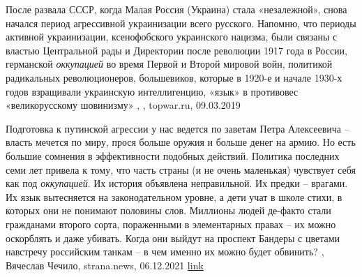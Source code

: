 После развала СССР, когда Малая Россия (Украина) стала «незалежной», снова
начался период агрессивной украинизации всего русского. Напомню, что периоды
активной украинизации, ксенофобского украинского нацизма, были связаны с
властью Центральной рады и Директории после революции 1917 года в России,
германской \emph{оккупацией} во время Первой и Второй мировой войн, политикой
радикальных революционеров, большевиков, которые в 1920-е и начале 1930-х годов
взращивали украинскую интеллигенцию, «язык» в противовес «великорусскому
шовинизму»
, , topwar.ru, 09.03.2019

Подготовка к путинской агрессии у нас ведется по заветам Петра Алексеевича –
власть мечется по миру, прося больше оружия и больше денег на армию. Но есть
большие сомнения в эффективности подобных действий.  Политика последних семи
лет привела к тому, что часть страны (и не очень маленькая) чувствует себя как
под \emph{оккупацией}. Их история объявлена неправильной. Их предки – врагами. Их язык
вытесняется на законодательном уровне, а дети учат в школе стихи, в которых они
не понимают половины слов. Миллионы людей де-факто стали гражданами второго
сорта, пораженными в элементарных правах – их можно оскорблять и даже убивать.
Когда они выйдут на проспект Бандеры с цветами навстречу российским танкам – в
чем именно их можно будет обвинить?
, 
Вячеслав Чечило, strana.news, 06.12.2021
\href{https://strana.news/opinions/365636-chuvstvujut-li-hrazhdane-ukrainy-etu-stranu-svoej.html}{link}
